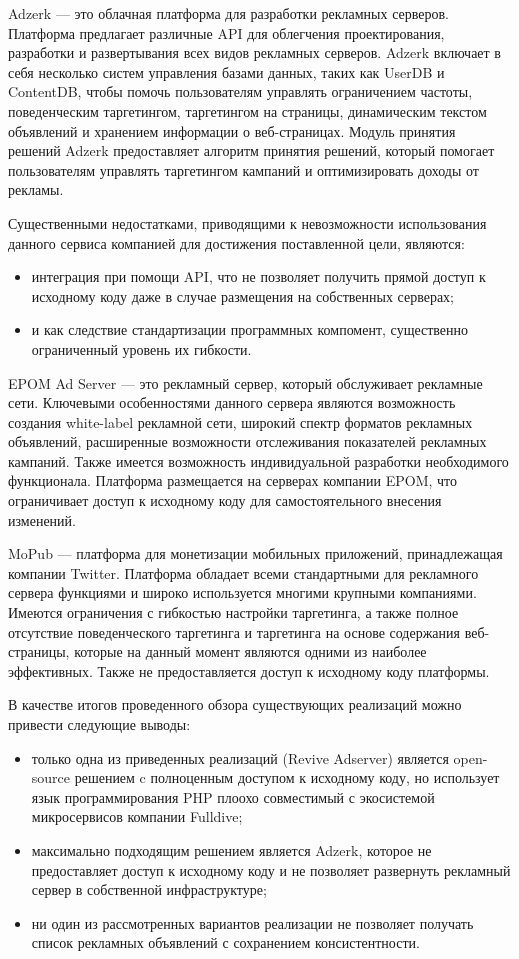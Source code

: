 \documentclass[specification,annotation,times]{itmo-student-thesis}
\begin{document}
Adzerk \cite{adzerk} — это облачная платформа для разработки рекламных серверов. Платформа предлагает различные API для облегчения проектирования, разработки и развертывания всех видов рекламных серверов. Adzerk включает в себя несколько систем управления базами данных, таких как UserDB и ContentDB, чтобы помочь пользователям управлять ограничением частоты, поведенческим таргетингом, таргетингом на страницы, динамическим текстом объявлений и хранением информации о веб-страницах. Модуль принятия решений Adzerk предоставляет алгоритм принятия решений, который помогает пользователям управлять таргетингом кампаний и оптимизировать доходы от рекламы. 

Существенными недостатками, приводящими к невозможности использования данного сервиса компанией для достижения поставленной цели, являются:
\begin{itemize}
\item интеграция при помощи API, что не позволяет получить прямой доступ к исходному коду даже в случае размещения на собственных серверах;
\item и как следствие стандартизации программных компомент, существенно ограниченный уровень их гибкости.
\end{itemize}

EPOM Ad Server \cite{epom-ad-server} — это рекламный сервер, который обслуживает рекламные сети. Ключевыми особенностями данного сервера являются возможность создания white-label рекламной сети, широкий спектр форматов рекламных объявлений, расширенные возможности отслеживания показателей рекламных кампаний. Также имеется возможность индивидуальной разработки необходимого функционала. Платформа размещается на серверах компании EPOM, что ограничивает доступ к исходному коду для самостоятельного внесения изменений.

MoPub \cite{mopub} — платформа для монетизации мобильных приложений, принадлежащая компании Twitter. Платформа обладает всеми стандартными для рекламного сервера функциями и широко используется многими крупными компаниями. Имеются ограничения с гибкостью настройки таргетинга, а также полное отсутствие поведенческого таргетинга и таргетинга на основе содержания веб-страницы, которые на данный момент являются одними из наиболее эффективных. Также не предоставляется доступ к исходному коду платформы.

В качестве итогов проведенного обзора существующих реализаций можно привести следующие выводы:
\begin{itemize}
\item только одна из приведенных реализаций (Revive Adserver) является open-source решением c полноценным доступом к исходному коду, но использует язык программирования PHP плоохо совместимый с экосистемой микросервисов компании Fulldive;
\item максимально подходящим решением является Adzerk, которое не предоставляет доступ к исходному коду и не позволяет развернуть рекламный сервер в собственной инфраструктуре;
\item ни один из рассмотренных вариантов реализации не позволяет получать список рекламных объявлений с сохранением консистентности.
\end{itemize}
\end{document}
